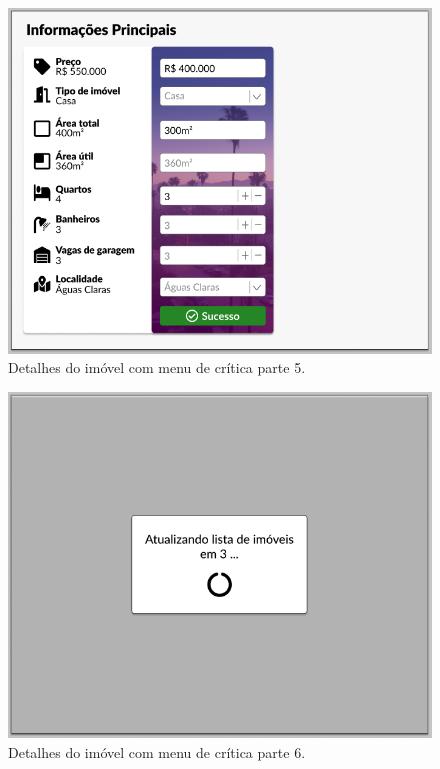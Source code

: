 \begin{figure}[H]
    \centering
    \includegraphics[scale=0.5]{figuras/proposta/prototipo5.jpg}
    \caption[Detalhes do imóvel com menu de crítica parte 5]{Detalhes do imóvel com menu de crítica parte 5.}
    \label{fig:prototipo_critico5}
\end{figure}

\begin{figure}[H]
    \centering
    \includegraphics[scale=0.5]{figuras/proposta/prototipo6.jpg}
    \caption[Detalhes do imóvel com menu de crítica parte 6]{Detalhes do imóvel com menu de crítica parte 6.}
    \label{fig:prototipo_critico6}
\end{figure}

